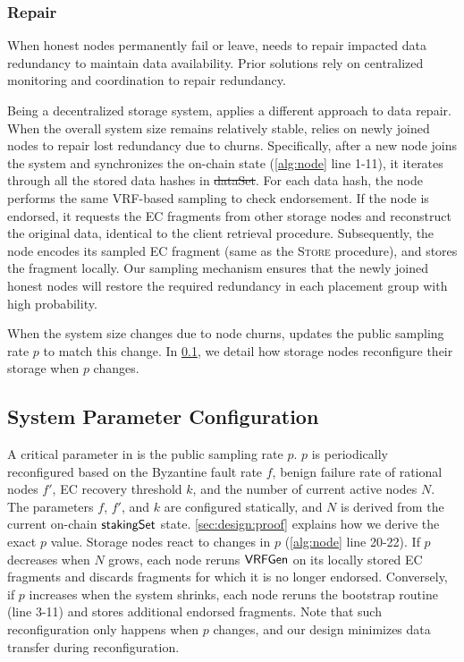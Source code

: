 \subsubsection{Repair}
\label{sec:design:proto:repair}
When honest nodes permanently fail or leave, \sys needs to repair impacted data redundancy to maintain data availability.
Prior solutions rely on centralized monitoring and coordination to repair redundancy.

Being a decentralized storage system, \sys applies a different approach to data repair.
When the overall system size remains relatively stable, \sys relies on newly joined nodes to repair lost redundancy due to churns.
Specifically, after a new node joins the system and synchronizes the on-chain state (\cref{alg:node} line 1-11), it iterates through all the stored data hashes in \st{dataSet}.
For each data hash, the node performs the same VRF-based sampling to check endorsement.
If the node is endorsed, it requests the EC fragments from other storage nodes and reconstruct the original data, identical to the client retrieval procedure.
Subsequently, the node encodes its sampled EC fragment (same as the \textsc{Store} procedure), and stores the fragment locally.
Our sampling mechanism ensures that the newly joined honest nodes will restore the required redundancy in each placement group with high probability.

When the system size changes due to node churns, \sys updates the public sampling rate $p$ to match this change.
In \cref{sec:design:param}, we detail how storage nodes reconfigure their storage when $p$ changes.

\subsection{System Parameter Configuration}
\label{sec:design:param}
A critical parameter in \sys is the public sampling rate $p$.
$p$ is periodically reconfigured based on the Byzantine fault rate $f$, benign failure rate of rational nodes $f'$, EC recovery threshold $k$, and the number of current active nodes $N$.
The parameters $f$, $f'$, and $k$ are configured statically, and $N$ is derived from the current on-chain $\textsf{stakingSet}$ state.
\cref{sec:design:proof} explains how we derive the exact $p$ value.
Storage nodes react to changes in $p$ (\cref{alg:node} line 20-22).
If $p$ decreases when $N$ grows, each node reruns $\textsf{VRFGen}$ on its locally stored EC fragments and discards fragments for which it is no longer endorsed.
Conversely, if $p$ increases when the system shrinks, each node reruns the bootstrap routine (line 3-11) and stores additional endorsed fragments.
Note that such reconfiguration only happens when $p$ changes, and our design minimizes data transfer during reconfiguration.

